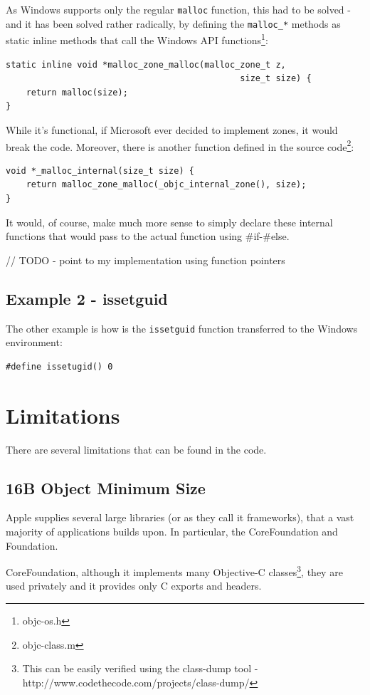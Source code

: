 \documentclass[a4paper, 11pt, fleqn]{book}
\begin{document}
As Windows supports only the regular \verb=malloc= function, this had to be solved - and it has been solved rather radically, by defining the \verb=malloc_*= methods as static inline methods that call the Windows API functions\footnote{objc-os.h}:

\begin{verbatim}
static inline void *malloc_zone_malloc(malloc_zone_t z, 
                                              size_t size) { 
    return malloc(size); 
}
\end{verbatim}

While it's functional, if Microsoft ever decided to implement zones, it would break the code. Moreover, there is another function defined in the source code\footnote{objc-class.m}:

\begin{verbatim}
void *_malloc_internal(size_t size) {
    return malloc_zone_malloc(_objc_internal_zone(), size);
}
\end{verbatim}

It would, of course, make much more sense to simply declare these internal functions that would pass to the actual function using #if-#else.

// TODO - point to my implementation using function pointers

\subsection{Example 2 - issetguid}
The other example is how is the \verb=issetguid= function transferred to the Windows environment:

\begin{verbatim}
#define issetugid() 0
\end{verbatim}

\section{Limitations}
There are several limitations that can be found in the code.

\subsection{16B Object Minimum Size}
Apple supplies several large libraries (or as they call it frameworks), that a vast majority of applications builds upon. In particular, the CoreFoundation and Foundation.

CoreFoundation, although it implements many Objective-C classes\footnote{This can be easily verified using the class-dump tool - http://www.codethecode.com/projects/class-dump/}, they are used privately and it provides only C exports and headers.
\end{document}
